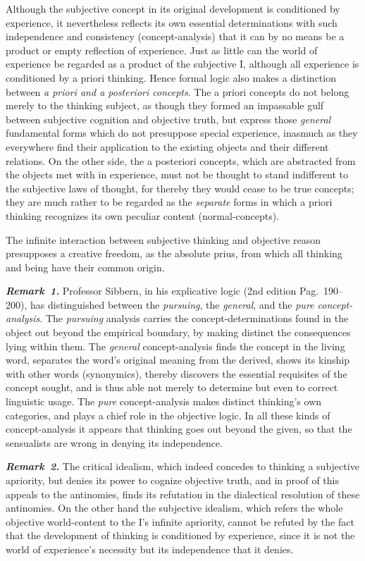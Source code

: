 \documentclass[12pt]{book}
\newcommand{\anm}[1]{\emph{\textbf{Remark~#1.}}}
\begin{document}
Although the subjective concept in its original development is conditioned
by experience, it nevertheless reflects its own essential determinations
with such independence and consistency (concept-analysis) that it can by no
means be a product or empty reflection of experience. Just as little can the
world of experience be regarded as a product of the subjective I, although
all experience is conditioned by a priori thinking. Hence formal logic also
makes a distinction between \emph{a priori and a posteriori concepts}. The a
priori concepts do not belong merely to the thinking subject, as though they
formed an impassable gulf between subjective cognition and objective truth,
but express those \emph{general} fundamental forms which do not presuppose
special experience, inasmuch as they everywhere find their application to
the existing objects and their different relations. On the other side, the a
posteriori concepts, which are abstracted from the objects met with in
experience, must not be thought to stand indifferent to the subjective laws
of thought, for thereby they would cease to be true concepts; they are much
rather to be regarded as the \emph{separate} forms in which a priori
thinking recognizes its own peculiar content (normal-concepts).

The infinite interaction between subjective thinking and objective reason
presupposes a creative freedom, as the absolute prius, from which all
thinking and being have their common origin.

\anm{1} Professor Sibbern, in his explicative logic (2nd edition Pag.\
190--200), has distinguished between the \emph{pursuing}, the
\emph{general}, and the \emph{pure concept-analysis}. The \emph{pursuing}
analysis carries the concept-determinations found in the object out beyond
the empirical boundary, by making distinct the consequences lying within
them. The \emph{general} concept-analysis finds the concept in the living
word, separates the word's original meaning from the derived, shows its
kinship with other words (synonymics), thereby discovers the essential
requisites of the concept sought, and is thus able not merely to determine
but even to correct linguistic usage. The \emph{pure} concept-analysis makes
distinct thinking's own categories, and plays a chief role in the objective
logic. In all these kinds of concept-analysis it appears that thinking goes
out beyond the given, so that the sensualists are wrong in denying its
independence.

\anm{2} The critical idealism, which indeed concedes to thinking a
subjective apriority, but denies its power to cognize objective truth, and
in proof of this appeals to the antinomies, finds its refutation in the
dialectical resolution of these antinomies. On the other hand the subjective
idealism, which refers the whole objective world-content to the I's infinite
apriority, cannot be refuted by the fact that the development of thinking is
conditioned by experience, since it is not the world of experience's
necessity but its independence that it denies.
\end{document}
